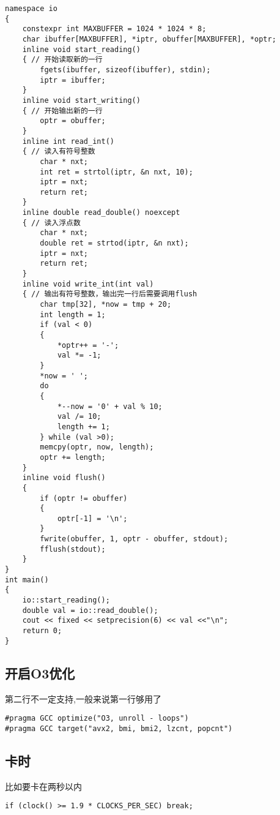 \documentclass[a4paper, fontset=none]{ctexart}
\begin{document}
\begin{verbatim}
namespace io
{
    constexpr int MAXBUFFER = 1024 * 1024 * 8;
    char ibuffer[MAXBUFFER], *iptr, obuffer[MAXBUFFER], *optr;
    inline void start_reading()
    { // 开始读取新的一行
        fgets(ibuffer, sizeof(ibuffer), stdin);
        iptr = ibuffer;
    }
    inline void start_writing()
    { // 开始输出新的一行
        optr = obuffer;
    }
    inline int read_int()
    { // 读入有符号整数
        char * nxt;
        int ret = strtol(iptr, &n nxt, 10);
        iptr = nxt;
        return ret;
    }
    inline double read_double() noexcept
    { // 读入浮点数
        char * nxt;
        double ret = strtod(iptr, &n nxt);
        iptr = nxt;
        return ret;
    }
    inline void write_int(int val)
    { // 输出有符号整数，输出完一行后需要调用flush
        char tmp[32], *now = tmp + 20;
        int length = 1;
        if (val < 0)
        {
            *optr++ = '-';
            val *= -1;
        }
        *now = ' ';
        do
        {
            *--now = '0' + val % 10;
            val /= 10;
            length += 1;
        } while (val >0);
        memcpy(optr, now, length);
        optr += length;
    }
    inline void flush()
    {
        if (optr != obuffer)
        {
            optr[-1] = '\n';
        }
        fwrite(obuffer, 1, optr - obuffer, stdout);
        fflush(stdout);
    }
}
int main()
{
    io::start_reading();
    double val = io::read_double();
    cout << fixed << setprecision(6) << val <<"\n";
    return 0;
}
\end{verbatim}
\subsection{开启O3优化}
第二行不一定支持,一般来说第一行够用了
\begin{verbatim}
#pragma GCC optimize("O3, unroll - loops")
#pragma GCC target("avx2, bmi, bmi2, lzcnt, popcnt")
\end{verbatim}
\subsection{卡时}
比如要卡在两秒以内

\begin{verbatim}
if (clock() >= 1.9 * CLOCKS_PER_SEC) break;
\end{verbatim}
\end{document}
